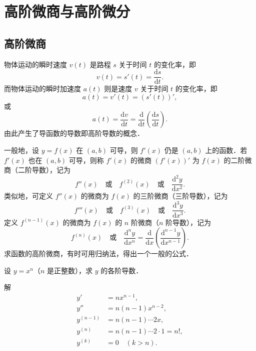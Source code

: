 \section{高阶微商与高阶微分}\label{sec:4.4}

\subsection{高阶微商}

物体运动的瞬时速度 $v(t)$ 是路程 $s$ 关于时间 $t$ 的变化率，即
\[
v(t)=s'(t)=\frac{\mathrm{d}s}{\mathrm{d}t}.
\]
而物体运动的瞬时加速度 $a(t)$ 则是速度 $v$ 关于时间 $t$ 的变化率，即
\[
a(t)=v'(t)=(s'(t))',
\]
或
\[
a(t)=\frac{\mathrm{d}v}{\mathrm{d}t}=\frac{\mathrm{d}}{\mathrm{d}t}\left(\frac{\mathrm{d}s}{\mathrm{d}t}\right).
\]
由此产生了导函数的导数即高阶导数的概念．

一般地，设 $y=f(x)$ 在 $(a,b)$ 可导，则 $f'(x)$ 仍是 $(a,b)$ 上的函数．若 $f'(x)$ 也在 $(a,b)$ 可导，则称 $f'(x)$ 的微商 $(f'(x))'$ 为 $f(x)$ 的二阶微商（二阶导数），记为
\[
f''(x)\quad\text{或}\quad f^{(2)}(x)\quad\text{或}\quad\frac{\mathrm{d}^{2}y}{\mathrm{d}x^{2}}.
\]
类似地，可定义 $f''(x)$ 的微商为 $f(x)$ 的三阶微商（三阶导数），记为
\[
f'''(x)\quad\text{或}\quad f^{(3)}(x)\quad\text{或}\quad\frac{\mathrm{d}^{3}y}{\mathrm{d}x^{3}}.
\]
定义 $f^{(n-1)}(x)$ 的微商为 $f(x)$ 的 $n$ 阶微商（$n$ 阶导数），记为
\[
f^{(n)}(x)\quad\text{或}\quad\frac{\mathrm{d}^{n}y}{\mathrm{d}x^{n}}=\frac{\mathrm{d}}{\mathrm{d}x}\left(\frac{\mathrm{d}^{n-1}y}{\mathrm{d}x^{n-1}}\right).
\]
求函数的高阶微商，有时可用归纳法，得出一个一般的公式．

\begin{example}\label{ex:4-4-1}
设 $y=x^{n}$（$n$ 是正整数），求 $y$ 的各阶导数．

解
\[
\begin{aligned}
y'&=nx^{n-1},\\
y''&=n(n-1)x^{n-2},\\
y^{(n-1)}&=n(n-1)\cdots 2x,\\
y^{(n)}&=n(n-1)\cdots 2\cdot 1=n!,\\
y^{(k)}&=0\quad(k>n).
\end{aligned}
\]
\end{example}

